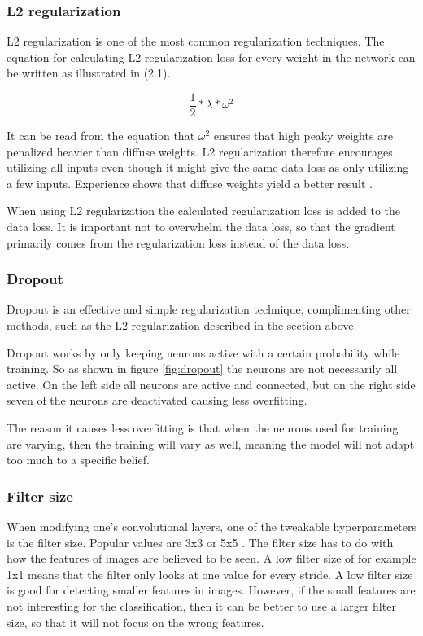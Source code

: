 \subsubsection{L2 regularization}
L2 regularization is one of the most common regularization techniques. The equation for calculating L2 regularization loss for every weight in the network can be written as illustrated in (2.1). 

\begin{equation}
\dfrac{1}{2} * \lambda * \omega^2
\end{equation}

It can be read from the equation that $\omega^2$ ensures that high peaky weights are penalized heavier than diffuse weights. L2 regularization therefore encourages utilizing all inputs even though it might give the same data loss as only utilizing a few inputs. Experience shows that diffuse weights yield a better result \citep{LC_cs231n}.

When using L2 regularization the calculated regularization loss is added to the data loss. It is important not to overwhelm the data loss, so that the gradient primarily comes from the regularization loss instead of the data loss. 


\subsubsection{Dropout}
Dropout is an effective and simple regularization technique, complimenting other methods, such as the L2 regularization described in the section above. 

Dropout works by only keeping neurons active with a certain probability while training. So as shown in figure \ref{fig:dropout} the neurons are not necessarily all active. On the left side all neurons are active and connected, but on the right side seven of the neurons are deactivated causing less overfitting.  


The reason it causes less overfitting is that when the neurons used for training are varying, then the training will vary as well, meaning the model will not adapt too much to a specific belief. 

\subsubsection{Filter size}
When modifying one's convolutional layers, one of the tweakable hyperparameters is the filter size. Popular values are 3x3 or 5x5 \citep{FCL}. The filter size has to do with how the features of images are believed to be seen. A low filter size of for example 1x1 means that the filter only looks at one value for every stride. A low filter size is good for detecting smaller features in images. However, if the small features are not interesting for the classification, then it can be better to use a larger filter size, so that it will not focus on the wrong features. 







